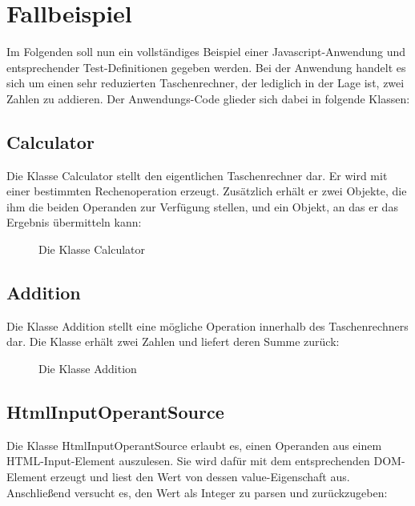 \section{Fallbeispiel}

Im Folgenden soll nun ein vollständiges Beispiel einer Javascript-Anwendung und entsprechender Test-Definitionen gegeben werden.
Bei der Anwendung handelt es sich um einen sehr reduzierten Taschenrechner, der lediglich in der Lage ist, zwei Zahlen zu addieren. Der Anwendungs-Code glieder sich dabei in folgende Klassen:

\subsection{Calculator}

Die Klasse Calculator stellt den eigentlichen Taschenrechner dar. Er wird mit einer bestimmten Rechenoperation erzeugt. Zusätzlich erhält er zwei Objekte, die ihm die beiden Operanden zur Verfügung stellen, und ein Objekt, an das er das Ergebnis übermitteln kann:

\begin{figure}[H]
	\begin{center}
		\caption{Die Klasse Calculator}
		\label{code:calculator}
	\end{center}
\end{figure}

\subsection{Addition}

Die Klasse Addition stellt eine mögliche Operation innerhalb des Taschenrechners dar. Die Klasse erhält zwei Zahlen und liefert deren Summe zurück:

\begin{figure}[H]
	\begin{center}
		\caption{Die Klasse Addition}
		\label{code:addition}
	\end{center}
\end{figure}

\subsection{HtmlInputOperantSource}

Die Klasse HtmlInputOperantSource erlaubt es, einen Operanden aus einem HTML-Input-Element auszulesen. Sie wird dafür mit dem entsprechenden DOM-Element erzeugt und liest den Wert von dessen value-Eigenschaft aus. Anschließend versucht es, den Wert als Integer zu parsen und zurückzugeben:

